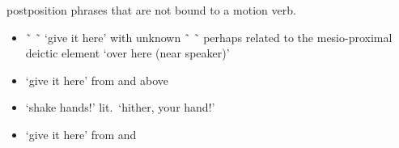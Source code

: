 \begin{morphdesc}[resume*=alphalist]
\begin{enumerate}
		postposition phrases that are not bound to a motion verb.
		\begin{itemize}
		\item	{} \~\  \~\  ‘give it here’
			\parencite[01/49]{leer:1973}
			with unknown  \~\  \~\ 
			perhaps related to the mesio-proximal deictic element
				 ‘over here (near speaker)’
		\item	{} ‘give it here’
			\parencite[01/49]{leer:1973}
			from  and  above
		\item	{} ‘shake hands!’ lit.\ ‘hither, your hand!’
			\parencites[01/48]{leer:1973}[146.997]{nyman-leer:1993}[10]{dauenhauer-dauenhauer:2002}
		\item	{} ‘give it here’
			\parencite[01/48]{leer:1973}
			from  and 
		\end{itemize}
	\end{enumerate}


\end{morphdesc}
